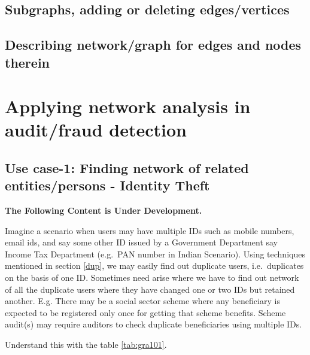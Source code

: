 \documentclass[
]{book}
\begin{document}
\hypertarget{subgraphs-adding-or-deleting-edgesvertices}{%
\section{Subgraphs, adding or deleting edges/vertices}\label{subgraphs-adding-or-deleting-edgesvertices}}

\hypertarget{describing-networkgraph-for-edges-and-nodes-therein}{%
\section{Describing network/graph for edges and nodes therein}\label{describing-networkgraph-for-edges-and-nodes-therein}}

\hypertarget{applying-network-analysis-in-auditfraud-detection}{%
\chapter{Applying network analysis in audit/fraud detection}\label{applying-network-analysis-in-auditfraud-detection}}

\hypertarget{dup_net}{%
\section{Use case-1: Finding network of related entities/persons - Identity Theft}\label{dup_net}}

\textbf{The Following Content is Under Development.}

Imagine a scenario when users may have multiple IDs such as mobile numbers, email ids, and say some other ID issued by a Government Department say Income Tax Department (e.g.~PAN number in Indian Scenario). Using techniques mentioned in section \ref{dup}, we may easily find out duplicate users, i.e.~duplicates on the basis of one ID. Sometimes need arise where we have to find out network of all the duplicate users where they have changed one or two IDs but retained another. E.g. There may be a social sector scheme where any beneficiary is expected to be registered only once for getting that scheme benefits. Scheme audit(s) may require auditors to check duplicate beneficiaries using multiple IDs.

Understand this with the table \ref{tab:gra101}.
\end{document}
